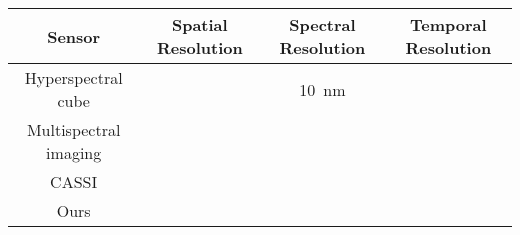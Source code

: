 \begin{table}[t]
    \centering
    \begin{adjustbox}{max width=\columnwidth}
    \setlength{\tabcolsep}{3pt}
    \begin{tabular}{|c|c|c|c|}
        \toprule
        Sensor & Spatial Resolution & Spectral Resolution & Temporal Resolution \\
        \hline
        Hyperspectral cube \cite{shaw03llj} & & \SI{10}{\nano\meter} &\\
        Multispectral imaging  & & &\\
        CASSI \cite{Wang17PAMI} & & &\\
        Ours & & &\\
    \bottomrule
    \end{tabular}
    \end{adjustbox}
\end{table}
